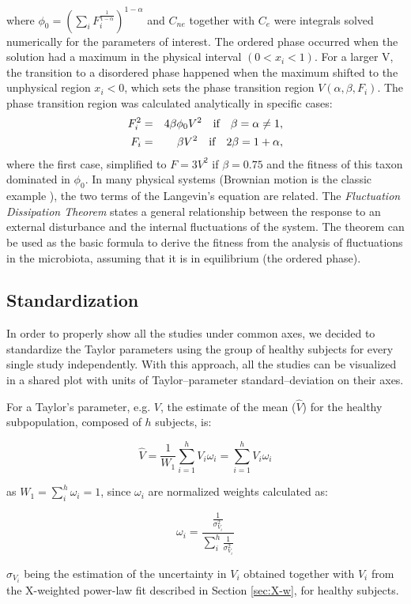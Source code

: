where $\phi_0 = \left(\sum_i F_i^{\frac{1}{1-\alpha}}\right)^{1-\alpha}$ and $C_{ne}$ together with $C_{e}$ were integrals solved numerically for the parameters of interest. The ordered phase occurred when the solution had a maximum in the physical interval $(0<x_i<1)$. For a larger V, the transition to a disordered phase happened when the maximum shifted to the unphysical region $x_i<0$, which sets the phase transition region $V(\alpha,\beta,F_i)$. The phase transition region was calculated analytically in specific cases:
\begin{eqnarray*}
F_i^2 &=& 4 \beta \phi_0 V^2\quad \textrm{if} \quad  \beta = \alpha \neq 1,\\
F_i &=& \beta V^2\quad \textrm{if} \quad  2\beta = 1+\alpha,
\notag
\end{eqnarray*}
where the first case, simplified to $F = 3 V^2$ if $\beta = 0.75$ and the fitness of this taxon dominated in $\phi_0$. 
In many physical systems (Brownian motion is the classic example \cite{Einstein}), the two terms of the Langevin's equation are related.  The \emph{Fluctuation Dissipation Theorem} states a general relationship between the response to an external disturbance and the internal fluctuations of the system\cite{FD}. The theorem can be used as the basic formula to derive the fitness from the analysis of fluctuations in the microbiota, assuming that it is in equilibrium (the ordered phase).  

\subsection*{Standardization} \label{sec:stan}
In order to properly show all the studies under common axes, we decided to standardize the Taylor parameters using the group of healthy subjects for every single study independently. With this approach, all the studies can be visualized in a shared plot with units of Taylor--parameter standard--deviation on their axes.

For a Taylor's parameter, e.g. $V$, the estimate of the mean ($\widehat{V}$) for the healthy subpopulation, composed of $h$ subjects, is:
\begin{linenomath}
$$\widehat{V} = \frac{1}{W_1}\sum_{i=1}^h V_i \omega_i=\sum_{i=1}^h V_i \omega_i$$
\end{linenomath}
as $W_1=\sum_i^h \omega_i=1$, since $\omega_i$ are normalized weights calculated as:
\begin{linenomath}
$$\omega_i = \frac{\frac{1}{\sigma^2_{V_i}}}{\sum_i^h\frac{1}{\sigma^2_{V_i}}}$$
\end{linenomath}
$\sigma_{V_i}$ being the estimation of the uncertainty in $V_i$ obtained together with $V_i$ from the X-weighted power-law fit described in Section \ref{sec:X-w}, for healthy subjects.

